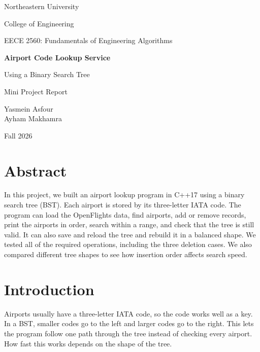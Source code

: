 \documentclass[12pt]{article}
\begin{document}
\begin{titlepage}
    \centering
    \vspace*{0.8in}
    {\Large Northeastern University\par}
    \vspace{0.15in}
    {\large College of Engineering\par}
    \vspace{0.5in}
    {\large EECE 2560: Fundamentals of Engineering Algorithms\par}
    \vfill
    {\Huge\bfseries Airport Code Lookup Service\par}
    \vspace{0.18in}
    {\LARGE Using a Binary Search Tree\par}
    \vspace{0.35in}
    {\Large Mini Project Report\par}
    \vfill
    {\large Yasmein Asfour\\[0.08in]Ayham Makhamra\par}
    \vspace{0.15in}
    {\large Fall 2026\par}
    \vspace*{0.8in}
\end{titlepage}

\tableofcontents
\newpage

\section{Abstract}

In this project, we built an airport lookup program in C++17 using a binary search tree (BST). Each airport is stored by its three-letter IATA code. The program can load the OpenFlights data, find airports, add or remove records, print the airports in order, search within a range, and check that the tree is still valid. It can also save and reload the tree and rebuild it in a balanced shape. We tested all of the required operations, including the three deletion cases. We also compared different tree shapes to see how insertion order affects search speed.

\section{Introduction}

Airports usually have a three-letter IATA code, so the code works well as a key. In a BST, smaller codes go to the left and larger codes go to the right. This lets the program follow one path through the tree instead of checking every airport. How fast this works depends on the shape of the tree.
\end{document}
